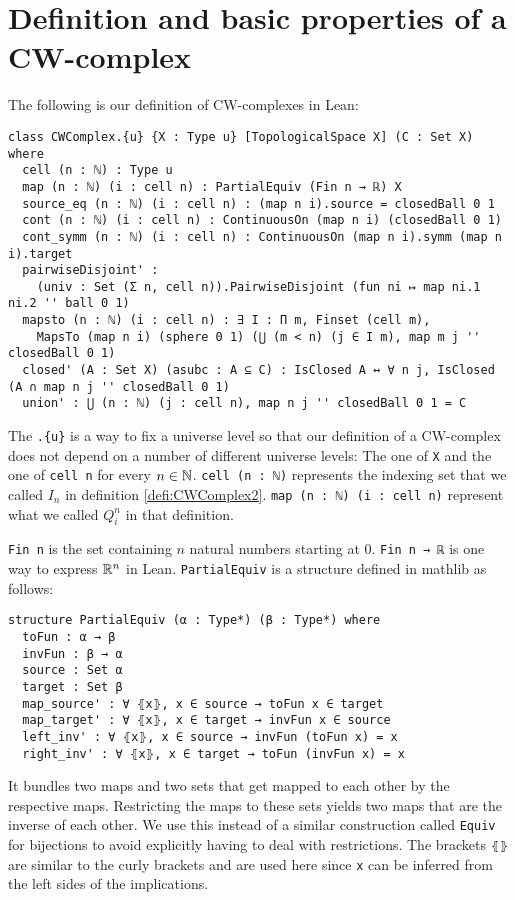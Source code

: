 \section{Definition and basic properties of a CW-complex}

The following is our definition of CW-complexes in Lean:

\begin{lstlisting}
class CWComplex.{u} {X : Type u} [TopologicalSpace X] (C : Set X) where
  cell (n : ℕ) : Type u
  map (n : ℕ) (i : cell n) : PartialEquiv (Fin n → ℝ) X
  source_eq (n : ℕ) (i : cell n) : (map n i).source = closedBall 0 1
  cont (n : ℕ) (i : cell n) : ContinuousOn (map n i) (closedBall 0 1)
  cont_symm (n : ℕ) (i : cell n) : ContinuousOn (map n i).symm (map n i).target
  pairwiseDisjoint' :
    (univ : Set (Σ n, cell n)).PairwiseDisjoint (fun ni ↦ map ni.1 ni.2 '' ball 0 1)
  mapsto (n : ℕ) (i : cell n) : ∃ I : Π m, Finset (cell m),
    MapsTo (map n i) (sphere 0 1) (⋃ (m < n) (j ∈ I m), map m j '' closedBall 0 1)
  closed' (A : Set X) (asubc : A ⊆ C) : IsClosed A ↔ ∀ n j, IsClosed (A ∩ map n j '' closedBall 0 1)
  union' : ⋃ (n : ℕ) (j : cell n), map n j '' closedBall 0 1 = C
\end{lstlisting}

The \lstinline|.{u}| is a way to fix a universe level so that our definition of a CW-complex does not depend on a number of different universe levels: The one of \lstinline{X} and the one of \lstinline{cell n} for every $n \in \mathbb{N}$.
\lstinline{cell (n : ℕ)} represents the indexing set that we called $I_n$ in definition \ref{defi:CWComplex2}. \lstinline{map (n : ℕ) (i : cell n)} represent what we called $Q_i^n$ in that definition. 

\lstinline{Fin n} is the set containing $n$ natural numbers starting at 0. 
\lstinline{Fin n → ℝ} is one way to express $\mathbb{R}^n$ in Lean. 
\lstinline{PartialEquiv} is a structure defined in mathlib as follows: 

\begin{lstlisting}
structure PartialEquiv (α : Type*) (β : Type*) where
  toFun : α → β
  invFun : β → α
  source : Set α
  target : Set β
  map_source' : ∀ ⦃x⦄, x ∈ source → toFun x ∈ target
  map_target' : ∀ ⦃x⦄, x ∈ target → invFun x ∈ source
  left_inv' : ∀ ⦃x⦄, x ∈ source → invFun (toFun x) = x
  right_inv' : ∀ ⦃x⦄, x ∈ target → toFun (invFun x) = x
\end{lstlisting}

It bundles two maps and two sets that get mapped to each other by the respective maps. 
Restricting the maps to these sets yields two maps that are the inverse of each other. 
We use this instead of a similar construction called \lstinline{Equiv} for bijections to avoid explicitly having to deal with restrictions. 
The brackets \lstinline{⦃⦄} are similar to the curly brackets and are used here since \lstinline{x} can be inferred from the left sides of the implications.

